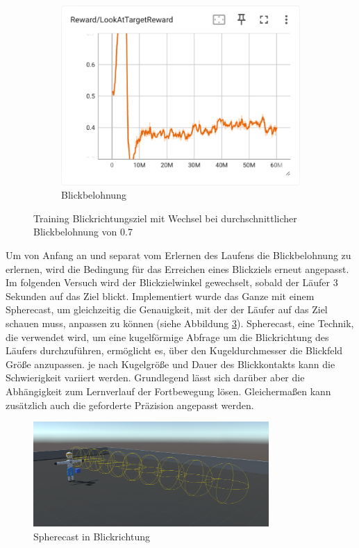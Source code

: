 \begin{figure}[H]
\begin{subfigure}{.49\textwidth}
      \centering  
      \includegraphics[width=\textwidth]{img/113_look_reward}
      \caption{Blickbelohnung}
      \label{fig:113_look_reward}
    \end{subfigure}
  \caption{Training Blickrichtungsziel mit Wechsel bei durchschnittlicher Blickbelohnung von 0.7}
  \label{fig:training_blickrichtungsziel_wechsel_07}
\end{figure}

Um von Anfang an und separat vom Erlernen des Laufens die Blickbelohnung zu erlernen, wird die Bedingung für das Erreichen eines Blickziels erneut angepasst. Im folgenden Versuch wird der Blickzielwinkel gewechselt, sobald der Läufer 3 Sekunden auf das Ziel blickt. Implementiert wurde das Ganze mit einem Spherecast, um gleichzeitig die Genauigkeit, mit der der Läufer auf das Ziel schauen muss, anpassen zu können (siehe Abbildung \ref{fig:spherecast}). Spherecast, eine Technik, die verwendet wird, um eine kugelförmige Abfrage um die Blickrichtung des Läufers durchzuführen, ermöglicht es, über den Kugeldurchmesser die Blickfeld Größe anzupassen. je nach Kugelgröße und Dauer des Blickkontakts kann die Schwierigkeit variiert werden. Grundlegend lässt sich darüber aber die Abhängigkeit zum Lernverlauf der Fortbewegung lösen. Gleichermaßen kann zusätzlich auch die geforderte Präzision angepasst werden.

\begin{figure}[H]
  \centering  
  \includegraphics[width=0.8\textwidth]{img/spherecast}
  \caption{Spherecast in Blickrichtung}
  \label{fig:spherecast}
\end{figure}

